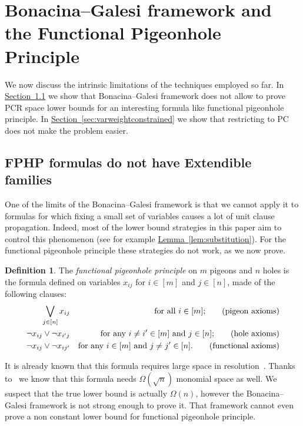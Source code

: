 \documentclass[11pt]{article}
\numberwithin{equation}{section}
\theoremstyle{definition}
\newtheorem{definition}[theorem]{Definition}
\theoremstyle{plain}
\newcommand{\expref}[2]{\hyperref[#2]{#1~\ref{#2}}}
\theoremstyle{plain}
\theoremstyle{definition}
\newcommand{\reflem}[1]{\expref{Lemma}{#1}}
\newcommand{\Lor}{\bigvee}
\newcommand{\introduceterm}[1]{{\emph{#1}}}
\newcommand{\KextendibleNok}{Extendible\xspace}
\begin{document}
\section{Bonacina--Galesi framework and the Functional Pigeonhole Principle}
\label{sec:limitations}

  We now discuss the intrinsic limitations of the techniques employed
  so far. In \expref{Section}{sec:fphp-no-kextendible} we show that
  Bonacina--Galesi framework does not allow to prove PCR space lower
  bounds for an interesting formula like functional pigeonhole
  principle. In \expref{Section}{sec:varweightconstrained} we show that
  restricting to PC does not make the problem easier.

\subsection{FPHP formulas do not have \KextendibleNok families}
\label{sec:fphp-no-kextendible}

One of the limits of the Bonacina--Galesi framework is that we cannot
apply it to formulas for which fixing a small set of variables causes
a lot of unit clause propagation. Indeed, most of the lower bound
strategies in this paper aim to control this phenomenon (see for
example \reflem{lem:substitution}). For the functional pigeonhole
principle these strategies do not work, as we now prove.


\begin{definition}\label{def:fphpformula}
  The \introduceterm{functional pigeonhole principle} on $m$ pigeons and $n$ holes is the formula defined on variables $x_{ij}$ for $i\in[m]$ and $j\in[n]$, made of the following clauses:
  \begin{align}
    \Lor_{j\in[n]} x_{ij} && \text{for all $i\in[m]$;} \tag{pigeon axioms}\\
    \lnot{x_{ij}} \lor \lnot{x_{i'j}} && \text{for any
      $i\not=i'\in[m]$ and $j\in[n]$;} \tag{hole axioms}\\
    \lnot{x_{ij}} \lor \lnot{x_{ij'}} && \text{for any $i\in[m]$ and
      $j\not=j'\in[n]$.\tag{functional axioms}}
  \end{align}
\end{definition}

%

%
%
%
%
%

It is already known that this formula requires large space in
resolution~\cite{BW01ShortProofs,AD08CombinatoricalCharacterization}.
%
Thanks to~\cite{GKT19SpaceWidth} we know that this formula needs
$\Omega(\sqrt{n})$ monomial space as well.
%
We suspect that the true lower bound is actually $\Omega(n)$, however
the Bonacina--Galesi framework is not strong enough to prove it.
That framework cannot even prove a non constant lower bound for
functional pigeonhole principle.
\end{document}
